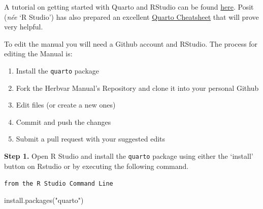 \documentclass[
  letterpaper,
  oneside,
  open=any]{scrbook}
\newenvironment{Shaded}{\begin{snugshade}}{\end{snugshade}}
\newcommand{\FunctionTok}[1]{\textcolor[rgb]{0.28,0.35,0.67}{#1}}
\newcommand{\NormalTok}[1]{\textcolor[rgb]{0.00,0.23,0.31}{#1}}
\newcommand{\StringTok}[1]{\textcolor[rgb]{0.13,0.47,0.30}{#1}}
\providecommand{\tightlist}{%
  \setlength{\itemsep}{0pt}\setlength{\parskip}{0pt}}\usepackage{longtable,booktabs,array}
\begin{document}
\begin{tcolorbox}[enhanced jigsaw, rightrule=.15mm, title=\textcolor{quarto-callout-tip-color}{\faLightbulb}\hspace{0.5em}{Tip}, colbacktitle=quarto-callout-tip-color!10!white, coltitle=black, bottomtitle=1mm, breakable, colback=white, leftrule=.75mm, arc=.35mm, toprule=.15mm, colframe=quarto-callout-tip-color-frame, opacityback=0, left=2mm, toptitle=1mm, titlerule=0mm, bottomrule=.15mm, opacitybacktitle=0.6]

A tutorial on getting started with Quarto and RStudio can be found
\href{https://quarto.org/docs/get-started/hello/rstudio.html}{here}.
Posit (\emph{née} `R Studio') has also prepared an excellent
\href{https://rstudio.github.io/cheatsheets/html/quarto.html}{Quarto
Cheatsheet} that will prove very helpful.

\end{tcolorbox}

To edit the manual you will need a Github account and RStudio. The
process for editing the Manual is:

\begin{enumerate}
\def\labelenumi{\arabic{enumi}.}
\tightlist
\item
  Install the \texttt{quarto} package
\item
  Fork the Herbvar Manual's Repository and clone it into your personal
  Github
\item
  Edit files (or create a new ones)
\item
  Commit and push the changes
\item
  Submit a pull request with your suggested edits
\end{enumerate}

\textbf{Step 1.} Open R Studio and install the \texttt{quarto} package
using either the `install' button on Rstudio or by executing the
following command.

\begin{codelisting}

\caption{\texttt{from the R Studio Command Line}}

\begin{Shaded}
\begin{Highlighting}[]
\FunctionTok{install.packages}\NormalTok{(}\StringTok{"quarto"}\NormalTok{)}
\end{Highlighting}
\end{Shaded}

\end{codelisting}
\end{document}
